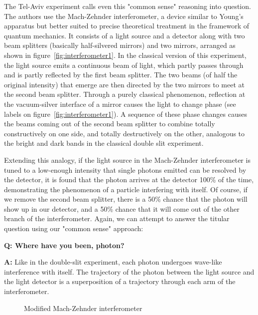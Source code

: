 \documentclass{article}
\newcommand{\Q}{\bfseries Q: }
\newcommand{\A}{\par\textbf{A:} \normalfont}
\begin{document}
The Tel-Aviv experiment calls even this "common sense" reasoning into question.  
The authors use the Mach-Zehnder interferometer, a device similar to Young's 
apparatus but better suited to precise theoretical treatment in the framework 
of quantum mechanics. It consists of a light source and a detector along with 
two beam splitters (basically half-silvered mirrors) and two mirrors, arranged 
as shown in figure~\ref{fig:interferometer1}. In the classical version of this 
experiment, the light source emits a continuous beam of light, which partly 
passes through and is partly reflected by the first beam splitter. The two 
beams (of half the original intensity) that emerge are then directed by the two 
mirrors to meet at the second beam splitter. Through a purely classical 
phenomenon, reflection at the vacuum-silver interface of a mirror causes the 
light to change phase (see labels on figure~\ref{fig:interferometer1}). A 
sequence of these phase changes causes the beams coming out of the second beam 
splitter to combine totally constructively on one side, and totally 
destructively on the other, analogous to the bright and dark bands in the 
classical double slit experiment. 

Extending this analogy, if the light source in the Mach-Zehnder interferometer 
is tuned to a low-enough intensity that single photons emitted can be resolved 
by the detector, it is found that the photon arrives at the detector 100\% of 
the time, demonstrating the phenomenon of a particle interfering with itself.  
Of course, if we remove the second beam splitter, there is a 50\% chance that 
the photon will show up in our detector, and a 50\% chance that it will come 
out of the other branch of the interferometer. Again, we can attempt to answer 
the titular question using our "common sense" approach: 

\begin{framed}

	\Q Where have you been, photon?  

	\A Like in the double-slit experiment, each photon undergoes wave-like 
	interference with itself. The trajectory of the photon between the 
	light source and the light detector is a superposition of a trajectory 
	through each arm of the interferometer. 

\end{framed}


\begin{figure}
	\centering
	
	\caption{Modified Mach-Zehnder interferometer}
	\label{fig:danan-1a}
\end{figure}
\end{document}
